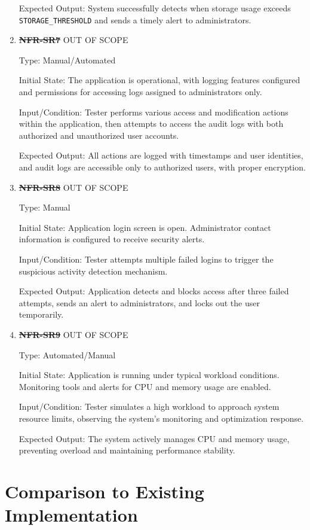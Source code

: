 \documentclass[12pt, titlepage]{article}
\begin{document}
\begin{enumerate}
Expected Output: System successfully detects when storage usage exceeds
\texttt{STORAGE\_THRESHOLD} and sends a timely alert to administrators.

\item{\textbf{\st{NFR-SR7}}} OUT OF SCOPE \label{NFR:SR7}

Type: Manual/Automated

Initial State: The application is operational, with logging features configured
and permissions for accessing logs assigned to administrators only.

Input/Condition: Tester performs various access and modification actions within
the application, then attempts to access the audit logs with both authorized and
unauthorized user accounts.
  
Expected Output: All actions are logged with timestamps and user identities, and
audit logs are accessible only to authorized users, with proper encryption.

\item{\textbf{\st{NFR-SR8}}} OUT OF SCOPE \label{NFR:SR8}

Type: Manual

Initial State: Application login screen is open. Administrator contact
information is configured to receive security alerts.

Input/Condition: Tester attempts multiple failed logins to trigger the
suspicious activity detection mechanism.

Expected Output:  Application detects and blocks access after three failed
attempts, sends an alert to administrators, and locks out the user temporarily.

\item{\textbf{\st{NFR-SR9}}} OUT OF SCOPE \label{NFR:SR9}

Type: Automated/Manual

Initial State: Application is running under typical workload conditions.
Monitoring tools and alerts for CPU and memory usage are enabled.

Input/Condition: Tester simulates a high workload to approach system resource
limits, observing the system's monitoring and optimization response.
  
Expected Output: The system actively manages CPU and memory usage, preventing
overload and maintaining performance stability.

\end{enumerate}
	
\section{Comparison to Existing Implementation}	
\end{document}

